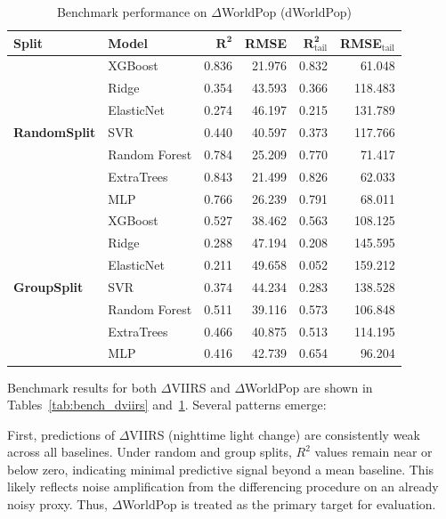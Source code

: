 \documentclass[11pt,conference,onecolumn]{IEEEtran}
\renewcommand{\arraystretch}{1.1} %
\begin{document}
\begin{table}[H]
\centering
\scriptsize
\setlength{\tabcolsep}{3pt}
\renewcommand{\arraystretch}{1.05}
\caption{Benchmark performance on $\Delta$WorldPop (dWorldPop)}
\label{tab:bench_dworldpop}
\begin{tabular}{llrrrr}
\toprule
\textbf{Split} & \textbf{Model} & $\mathbf{R^2}$ & \textbf{RMSE} & $\mathbf{R^2_{\mathrm{tail}}}$ & \textbf{RMSE}$_{\mathrm{tail}}$ \\
\midrule
\multirow{7}{*}{\textbf{RandomSplit}} & XGBoost     & 0.836 & 21.976 & 0.832 &  61.048 \\
                            & Ridge       & 0.354 & 43.593 & 0.366 & 118.483 \\
                            & ElasticNet  & 0.274 & 46.197 & 0.215 & 131.789 \\
                            & SVR         & 0.440 & 40.597 & 0.373 & 117.766 \\
                            & Random Forest & 0.784 & 25.209 & 0.770 &  71.417 \\
                            & ExtraTrees  & 0.843 & 21.499 & 0.826 &  62.033 \\
                            & MLP         & 0.766 & 26.239 & 0.791 &  68.011 \\
\midrule
\multirow{7}{*}{\textbf{GroupSplit}} & XGBoost     & 0.527 & 38.462 & 0.563 & 108.125 \\
                            & Ridge       & 0.288 & 47.194 & 0.208 & 145.595 \\
                            & ElasticNet  & 0.211 & 49.658 & 0.052 & 159.212 \\
                            & SVR         & 0.374 & 44.234 & 0.283 & 138.528 \\
                            & Random Forest & 0.511 & 39.116 & 0.573 & 106.848 \\
                            & ExtraTrees  & 0.466 & 40.875 & 0.513 & 114.195 \\
                            & MLP         & 0.416 & 42.739 & 0.654 &  96.204 \\
\bottomrule
\end{tabular}
\end{table}

Benchmark results for both $\Delta$VIIRS and $\Delta$WorldPop are shown in Tables~\ref{tab:bench_dviirs} and~\ref{tab:bench_dworldpop}. Several patterns emerge:

First, predictions of $\Delta$VIIRS (nighttime light change) are consistently weak across all baselines. Under random and group splits, $R^2$ values remain near or below zero, indicating minimal predictive signal beyond a mean baseline. This likely reflects noise amplification from the differencing procedure on an already noisy proxy. Thus, $\Delta$WorldPop is treated as the primary target for evaluation.
\end{document}
